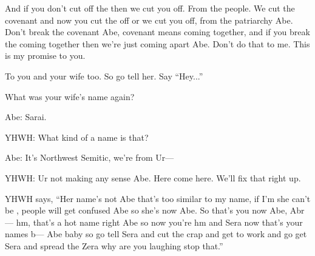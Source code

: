 {
}
{
}
{
	And if you don't cut off the {\penisc} then we cut you off.
	From the people. We cut the covenant and now you cut the
	{\penisd} off or we cut you off, from the patriarchy Abe.
	Don't break the covenant Abe, covenant means coming together,
	and if you break the coming together then we're just coming
	apart Abe. Don't do that to me. This is my promise to you.

	To you and your wife too. So go tell her. Say ``Hey...''

	What was your wife's name again?
	
	Abe: Sarai.

	YHWH: What kind of a name is that?
	
	Abe: It's Northwest Semitic, we're from Ur---
	
	YHWH: Ur not making any sense Abe. Here come here. We'll fix that right up.

}

{
}
{
}
{
	YHWH says, ``Her name's not  Abe that's too similar to my name,
	if I'm  she can't be , people will get confused Abe
	so she's  now Abe. So that's you now Abe, Abr--- hm,
	 that's a hot name right Abe so now you're hm and Sera
	now that's your names b--- Abe baby so go tell Sera and cut the crap and get
	to work and go get Sera and spread the Zera why are you laughing stop that.''
}

